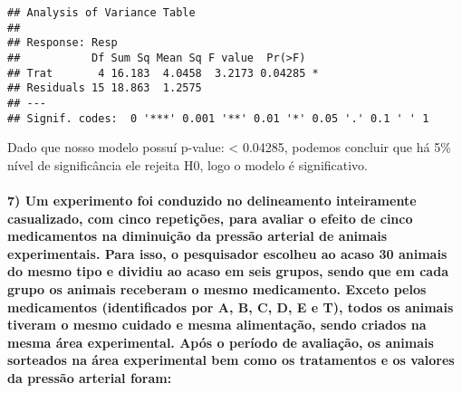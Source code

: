 \documentclass[
]{article}
\begin{document}
\begin{verbatim}
## Analysis of Variance Table
## 
## Response: Resp
##           Df Sum Sq Mean Sq F value  Pr(>F)  
## Trat       4 16.183  4.0458  3.2173 0.04285 *
## Residuals 15 18.863  1.2575                  
## ---
## Signif. codes:  0 '***' 0.001 '**' 0.01 '*' 0.05 '.' 0.1 ' ' 1
\end{verbatim}

Dado que nosso modelo possuí p-value: \textless{} 0.04285, podemos
concluir que há 5\% nível de significância ele rejeita H0, logo o modelo
é significativo.

\hypertarget{um-experimento-foi-conduzido-no-delineamento-inteiramente-casualizado-com-cinco-repetiuxe7uxf5es-para-avaliar-o-efeito-de-cinco-medicamentos-na-diminuiuxe7uxe3o-da-pressuxe3o-arterial-de-animais-experimentais.-para-isso-o-pesquisador-escolheu-ao-acaso-30-animais-do-mesmo-tipo-e-dividiu-ao-acaso-em-seis-grupos-sendo-que-em-cada-grupo-os-animais-receberam-o-mesmo-medicamento.-exceto-pelos-medicamentos-identificados-por-a-b-c-d-e-e-t-todos-os-animais-tiveram-o-mesmo-cuidado-e-mesma-alimentauxe7uxe3o-sendo-criados-na-mesma-uxe1rea-experimental.-apuxf3s-o-peruxedodo-de-avaliauxe7uxe3o-os-animais-sorteados-na-uxe1rea-experimental-bem-como-os-tratamentos-e-os-valores-da-pressuxe3o-arterial-foram}{%
\paragraph{7) Um experimento foi conduzido no delineamento inteiramente
casualizado, com cinco repetições, para avaliar o efeito de cinco
medicamentos na diminuição da pressão arterial de animais experimentais.
Para isso, o pesquisador escolheu ao acaso 30 animais do mesmo tipo e
dividiu ao acaso em seis grupos, sendo que em cada grupo os animais
receberam o mesmo medicamento. Exceto pelos medicamentos (identificados
por A, B, C, D, E e T), todos os animais tiveram o mesmo cuidado e mesma
alimentação, sendo criados na mesma área experimental. Após o período de
avaliação, os animais sorteados na área experimental bem como os
tratamentos e os valores da pressão arterial
foram:}\label{um-experimento-foi-conduzido-no-delineamento-inteiramente-casualizado-com-cinco-repetiuxe7uxf5es-para-avaliar-o-efeito-de-cinco-medicamentos-na-diminuiuxe7uxe3o-da-pressuxe3o-arterial-de-animais-experimentais.-para-isso-o-pesquisador-escolheu-ao-acaso-30-animais-do-mesmo-tipo-e-dividiu-ao-acaso-em-seis-grupos-sendo-que-em-cada-grupo-os-animais-receberam-o-mesmo-medicamento.-exceto-pelos-medicamentos-identificados-por-a-b-c-d-e-e-t-todos-os-animais-tiveram-o-mesmo-cuidado-e-mesma-alimentauxe7uxe3o-sendo-criados-na-mesma-uxe1rea-experimental.-apuxf3s-o-peruxedodo-de-avaliauxe7uxe3o-os-animais-sorteados-na-uxe1rea-experimental-bem-como-os-tratamentos-e-os-valores-da-pressuxe3o-arterial-foram}}
\end{document}

